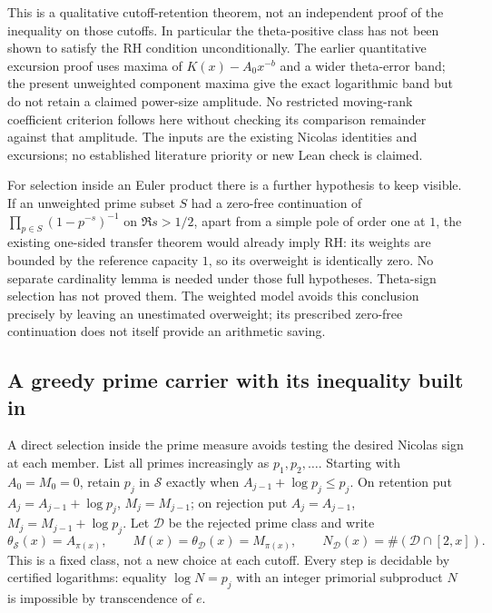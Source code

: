 \documentclass[11pt]{article}
\theoremstyle{definition}
\begin{document}
This is a qualitative cutoff-retention theorem, not an
independent proof of the inequality on those cutoffs.
In particular the theta-positive class has not been shown
to satisfy the RH condition unconditionally.
The earlier quantitative excursion proof uses maxima of
$K(x)-A_0x^{-b}$ and a wider theta-error band; the present
unweighted component maxima give the exact logarithmic band
but do not retain a claimed power-size amplitude.
No restricted moving-rank coefficient criterion follows here
without checking its comparison remainder against that amplitude.
The inputs are the existing Nicolas identities and excursions;
no established literature priority or new Lean check is claimed.

For selection inside an Euler product there is a further
hypothesis to keep visible. If an unweighted prime subset $S$
had a zero-free continuation of
$\prod_{p\in S}(1-p^{-s})^{-1}$ on $\Re s>1/2$, apart from
a simple pole of order one at $1$, the existing one-sided
transfer theorem would already imply RH: its weights are
bounded by the reference capacity $1$, so its overweight
is identically zero. No separate cardinality lemma is needed
under those full hypotheses.
Theta-sign selection has not proved them.
The weighted model avoids this conclusion precisely by
leaving an unestimated overweight; its prescribed zero-free
continuation does not itself provide an arithmetic saving.

\subsection{A greedy prime carrier with its inequality built in}
\label{sec:greedy-prime-cap}

A direct selection inside the prime measure avoids testing the
desired Nicolas sign at each member. List all primes increasingly
as $p_1,p_2,\ldots$. Starting with $A_0=M_0=0$, retain $p_j$
in $\mathcal S$ exactly when $A_{j-1}+\log p_j\le p_j$.
On retention put $A_j=A_{j-1}+\log p_j$, $M_j=M_{j-1}$;
on rejection put $A_j=A_{j-1}$, $M_j=M_{j-1}+\log p_j$.
Let $\mathcal D$ be the rejected prime class and write
\[
 \theta_{\mathcal S}(x)=A_{\pi(x)},\qquad
 M(x)=\theta_{\mathcal D}(x)=M_{\pi(x)},\qquad
 N_{\mathcal D}(x)=\#(\mathcal D\cap[2,x]).
\]
This is a fixed class, not a new choice at each cutoff.
Every step is decidable by certified logarithms: equality
$\log N=p_j$ with an integer primorial subproduct $N$ is
impossible by transcendence of $e$.
\end{document}
